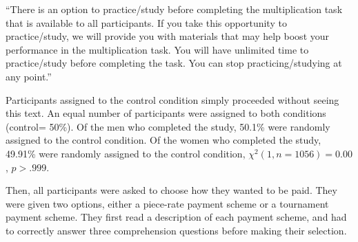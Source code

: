 \documentclass[letterpaper, nobind]{templates/ociamthesis}
\begin{document}
``There is an option to practice/study before completing the multiplication task that is available to all participants. If you take this opportunity to practice/study, we will provide you with materials that may help boost your performance in the multiplication task. You will have unlimited time to practice/study before completing the task. You can stop practicing/studying at any point.''

Participants assigned to the control condition simply proceeded without seeing this text. An equal number of participants were assigned to both conditions (control= 50\%). Of the men who completed the study, 50.1\% were randomly assigned to the control condition. Of the women who completed the study, 49.91\% were randomly assigned to the control condition, \(\chi^2(1, n = 1056) = 0.00\), \(p > .999\).

Then, all participants were asked to choose how they wanted to be paid. They were given two options, either a piece-rate payment scheme or a tournament payment scheme. They first read a description of each payment scheme, and had to correctly answer three comprehension questions before making their selection.
\end{document}
